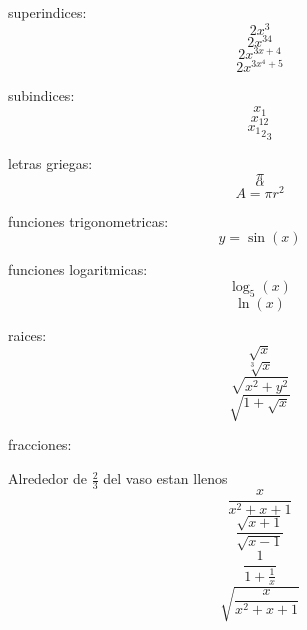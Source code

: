 \documentclass[11pt]{article}
\begin{document}
superindices: $$2x^3$$
$$2x^{34}$$
$$2x^{3x+4}$$
$$2x^{3x^4 +5}$$

subindices:
$$x_1$$
$$x_{12}$$
$${{{x_1}_2}_3}$$

letras griegas:
$$\pi$$
$$\alpha$$
$$A=\pi r^2$$

funciones trigonometricas:
$$ y=\sin(x)$$

funciones logaritmicas: 
$$\log_5(x)$$
$$\ln(x)$$

raices:
$$\sqrt{x}$$
$$\sqrt[3]{x}$$
$$\sqrt{x^2 + y^2}$$
$$\sqrt{1+\sqrt{x}}$$

fracciones:

Alrededor de $\displaystyle{\frac{2}{3}}$ del vaso estan llenos
$$\frac{x}{x^2+x+1}$$
$$\frac{\sqrt{x + 1}}{\sqrt{x-1}}$$
$$\frac{1}{1 + \frac{1}{x}}$$
$$\sqrt{\frac{x}{x^2+x+1}}$$
\end{document}
